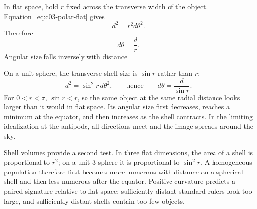 In flat space, hold \(r\) fixed across the transverse width of the object. Equation~\eqref{eq:c03-polar-flat} gives
\begin{equation}
d^2 = r^2 d\theta^2.
\label{eq:c03-flat-angle-step}
\end{equation}
Therefore
\begin{equation}
d\theta = \frac{d}{r}.
\label{eq:c03-flat-angle}
\end{equation}
Angular size falls inversely with distance.

On a unit sphere, the transverse shell size is \(\sin r\) rather than \(r\):
\begin{equation}
d^2 = \sin^2 r\, d\theta^2,
\qquad\text{hence}\qquad
d\theta = \frac{d}{\sin r}.
\label{eq:c03-spherical-angle}
\end{equation}
For \(0<r<\pi\), \(\sin r<r\), so the same object at the same radial distance looks larger than it would in flat space. Its angular size first decreases, reaches a minimum at the equator, and then increases as the shell contracts. In the limiting idealization at the antipode, all directions meet and the image spreads around the sky.

\begin{classroomqa}
\end{classroomqa}

Shell volumes provide a second test. In three flat dimensions, the area of a shell is proportional to \(r^2\); on a unit \(3\)-sphere it is proportional to \(\sin^2r\). A homogeneous population therefore first becomes more numerous with distance on a spherical shell and then less numerous after the equator. Positive curvature predicts a paired signature relative to flat space: sufficiently distant standard rulers look too large, and sufficiently distant shells contain too few objects.

